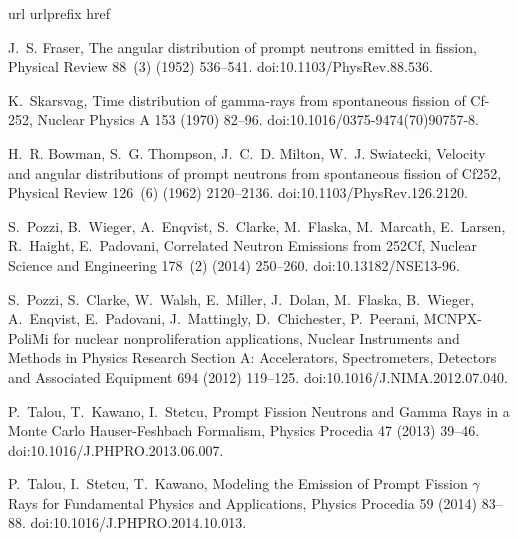 \documentclass[preprint,12pt]{elsarticle}
\begin{document}
\begin{thebibliography}{10}
	\expandafter\ifx\csname url\endcsname\relax
	\def\url#1{\texttt{#1}}\fi
	\expandafter\ifx\csname urlprefix\endcsname\relax\def\urlprefix{URL }\fi
	\expandafter\ifx\csname href\endcsname\relax
	\def\href#1#2{#2} \def\path#1{#1}\fi
	
	J.~S. Fraser, {The angular distribution of prompt neutrons emitted in fission},
	Physical Review 88~(3) (1952) 536--541.
	\newblock \href {https://doi.org/10.1103/PhysRev.88.536}
	{\path{doi:10.1103/PhysRev.88.536}}.
	
	K.~Skarsvag, {Time distribution of gamma-rays from spontaneous fission of
		Cf-252}, Nuclear Physics A 153 (1970) 82--96.
	\newblock \href {https://linkinghub.elsevier.com/retrieve/pii/0375947470907578}
	{\path{doi:10.1016/0375-9474(70)90757-8}}.
	
	H.~R. Bowman, S.~G. Thompson, J.~C.~D. Milton, W.~J. Swiatecki, {Velocity and
		angular distributions of prompt neutrons from spontaneous fission of Cf252},
	Physical Review 126~(6) (1962) 2120--2136.
	\newblock \href {https://doi.org/10.1103/PhysRev.126.2120}
	{\path{doi:10.1103/PhysRev.126.2120}}.
	
	S.~Pozzi, B.~Wieger, A.~Enqvist, S.~Clarke, M.~Flaska, M.~Marcath, E.~Larsen,
	R.~Haight, E.~Padovani, {Correlated Neutron Emissions from 252Cf}, Nuclear
	Science and Engineering 178~(2) (2014) 250--260.
	\newblock \href {https://doi.org/10.13182/NSE13-96}
	{\path{doi:10.13182/NSE13-96}}.
	
	S.~Pozzi, S.~Clarke, W.~Walsh, E.~Miller, J.~Dolan, M.~Flaska, B.~Wieger,
	A.~Enqvist, E.~Padovani, J.~Mattingly, D.~Chichester, P.~Peerani,
	{MCNPX-PoliMi for nuclear nonproliferation applications}, Nuclear Instruments
	and Methods in Physics Research Section A: Accelerators, Spectrometers,
	Detectors and Associated Equipment 694 (2012) 119--125.
	\newblock \href {https://doi.org/10.1016/J.NIMA.2012.07.040}
	{\path{doi:10.1016/J.NIMA.2012.07.040}}.
	
	P.~Talou, T.~Kawano, I.~Stetcu, {Prompt Fission Neutrons and Gamma Rays in a
		Monte Carlo Hauser-Feshbach Formalism}, Physics Procedia 47 (2013) 39--46.
	\newblock \href {https://doi.org/10.1016/J.PHPRO.2013.06.007}
	{\path{doi:10.1016/J.PHPRO.2013.06.007}}.
	
	P.~Talou, I.~Stetcu, T.~Kawano, {Modeling the Emission of Prompt Fission
		$\gamma$ Rays for Fundamental Physics and Applications}, Physics Procedia 59
	(2014) 83--88.
	\newblock \href {https://doi.org/10.1016/J.PHPRO.2014.10.013}
	{\path{doi:10.1016/J.PHPRO.2014.10.013}}.
	

\end{thebibliography}
\end{document}
